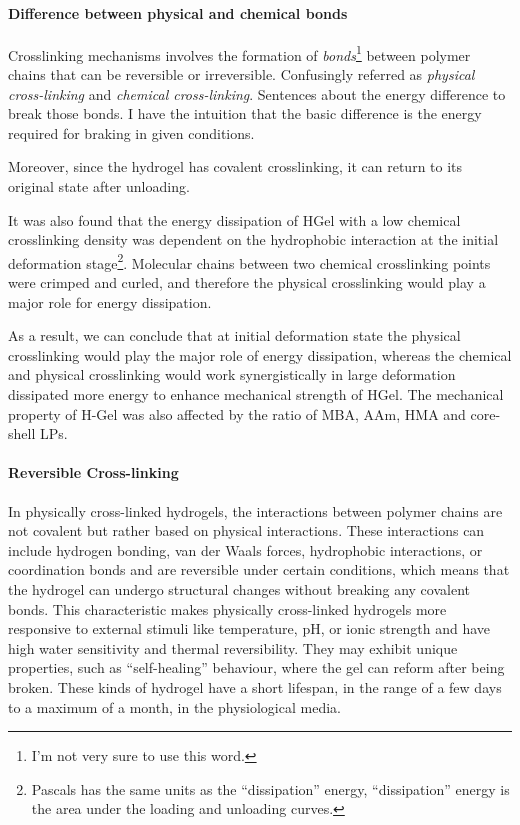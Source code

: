 \paragraph{Difference between physical and chemical bonds}
Crosslinking mechanisms involves the formation of \textit{bonds}\footnote{I'm not very sure to use this word.} between polymer chains that can be reversible or irreversible.
Confusingly referred as \textit{physical cross-linking} and \textit{chemical cross-linking}.
Sentences about the energy difference to break those bonds.
I have the intuition that the basic difference is the energy required for braking in given conditions.


Moreover, since the hydrogel has covalent crosslinking, it can return to its original state after unloading\citep{xuRoleChemicalPhysical2018}.

It was also found that the energy dissipation of HGel with a low chemical crosslinking density was dependent on the hydrophobic interaction at the initial deformation stage\citep{xuRoleChemicalPhysical2018}\footnote{Pascals has the same units as the ``dissipation'' energy, ``dissipation'' energy is the area under the loading and unloading curves.}.
Molecular chains between two chemical crosslinking points were crimped and curled, and therefore the physical crosslinking would play a major role for energy dissipation.

As a result, we can conclude that at initial deformation state the physical crosslinking would play the major role of energy dissipation, whereas the chemical and physical crosslinking would work synergistically in large deformation dissipated more energy to enhance mechanical strength of HGel\citep{xuRoleChemicalPhysical2018}.
The mechanical property of H-Gel was also affected by the ratio of MBA, AAm, HMA and core-shell LPs\citep{xuRoleChemicalPhysical2018}. 



\paragraph{Reversible Cross-linking}\citep{priyaComprehensiveReviewHydrogel2024}
In physically cross-linked hydrogels, the interactions between polymer chains are not covalent but rather based on physical interactions. 
These interactions can include hydrogen bonding, van der Waals forces, hydrophobic interactions, or coordination bonds and are reversible under certain conditions, which means that the hydrogel can undergo structural changes without breaking any covalent bonds.
This characteristic makes physically cross-linked hydrogels more responsive to external stimuli like temperature, pH, or ionic strength and have high water sensitivity and thermal reversibility. 
They may exhibit unique properties, such as “self-healing” behaviour, where the gel can reform after being broken.
These kinds of hydrogel have a short lifespan, in the range of a few days to a maximum of a month, in the physiological media. 

